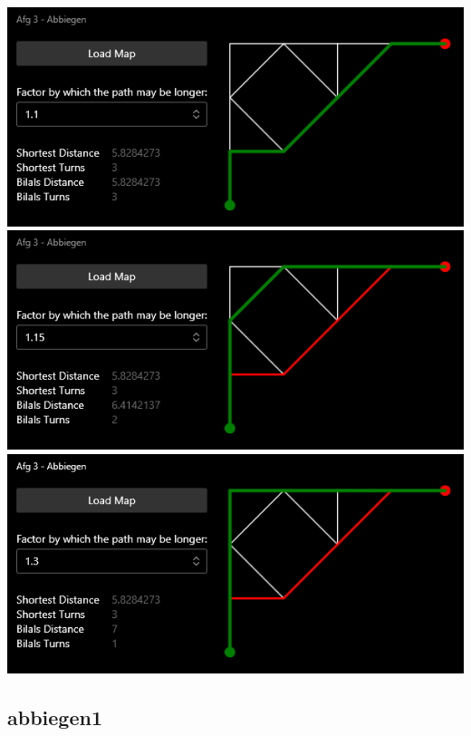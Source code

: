 \documentclass{article}
\begin{document}
\begin{center}
\includegraphics[width=\textwidth]{examples/0_10.png}
\includegraphics[width=\textwidth]{examples/0_15.png}
\includegraphics[width=\textwidth]{examples/0_30.png}
\end{center}

\subsection{abbiegen1}
\end{document}
